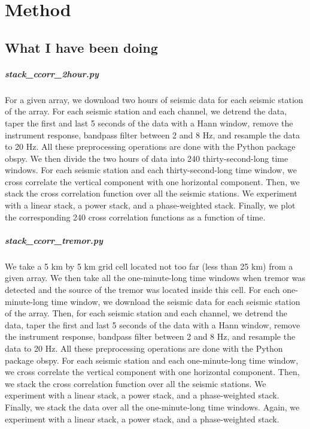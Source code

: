 \documentclass[main.tex]{subfiles}
\begin{document}
\chapter{Method}

\section{What I have been doing}

\paragraph{stack\_ccorr\_2hour.py} For a given array, we download two hours of seismic data for each seismic station of the array. For each seismic station and each channel, we detrend the data, taper the first and last 5 seconds of the data with a Hann window, remove the instrument response, bandpass filter between 2 and 8 Hz, and resample the data to 20 Hz. All these preprocessing operations are done with the Python package obspy. We then divide the two hours of data into 240 thirty-second-long time windows. For each seismic station and each thirty-second-long time window, we cross correlate the vertical component with one horizontal component. Then, we stack the cross correlation function over all the seismic stations. We experiment with a linear stack, a power stack, and a phase-weighted stack. Finally, we plot the corresponding 240 cross correlation functions as a function of time. 

\paragraph{stack\_ccorr\_tremor.py} We take a 5 km by 5 km grid cell located not too far (less than 25 km) from a given array. We then take all the one-minute-long time windows when tremor was detected and the source of the tremor was located inside this cell. For each one-minute-long time window, we download the seismic data for each seismic station of the array. Then, for each seismic station and each channel, we detrend the data, taper the first and last 5 seconds of the data with a Hann window, remove the instrument response, bandpass filter between 2 and 8 Hz, and resample the data to 20 Hz. All these preprocessing operations are done with the Python package obspy. For each seismic station and each one-minute-long time window, we cross correlate the vertical component with one horizontal component. Then, we stack the cross correlation function over all the seismic stations. We experiment with a linear stack, a power stack, and a phase-weighted stack. Finally, we stack the data over all the one-minute-long time windows. Again, we experiment with a linear stack, a power stack, and a phase-weighted stack.
\end{document}
